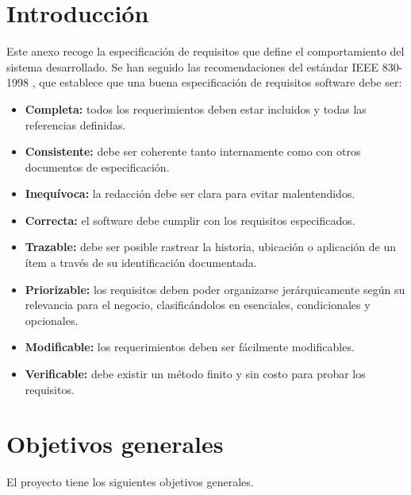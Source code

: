 
\section{Introducción}\label{intoduccion-requisitos}

Este anexo recoge la especificación de requisitos que define el comportamiento del sistema desarrollado. Se han seguido las recomendaciones del estándar IEEE 830-1998 \cite{ieee}, que establece que una buena especificación de requisitos software debe ser:

\begin{itemize}
    \item \textbf{Completa:} todos los requerimientos deben estar incluidos y todas las referencias definidas.
    \item \textbf{Consistente:} debe ser coherente tanto internamente como con otros documentos de especificación.
    \item \textbf{Inequívoca:} la redacción debe ser clara para evitar malentendidos.
    \item \textbf{Correcta:} el software debe cumplir con los requisitos especificados.
    \item \textbf{Trazable:} debe ser posible rastrear la historia, ubicación o aplicación de un ítem a través de su identificación documentada.
    \item \textbf{Priorizable:} los requisitos deben poder organizarse jerárquicamente según su relevancia para el negocio, clasificándolos en esenciales, condicionales y opcionales.
    \item \textbf{Modificable:} los requerimientos deben ser fácilmente modificables.
    \item \textbf{Verificable:} debe existir un método finito y sin costo para probar los requisitos.
\end{itemize}

\section{Objetivos generales}\label{objetivos-generales}

El proyecto tiene los siguientes objetivos generales.

